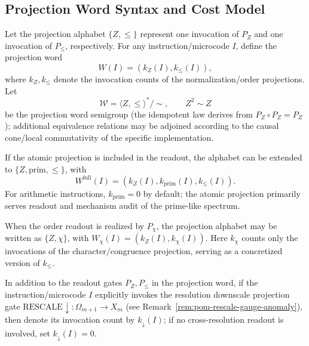 \subsection{Projection Word Syntax and Cost Model}\label{subsec:pom-words}
\begin{definition}\label{def:pom-projection-word}
Let the projection alphabet $\{Z,\le\}$ represent one invocation of $P_Z$ and one invocation of $P_{\le}$, respectively. For any instruction/microcode $I$, define the projection word
\[
W(I)=(k_Z(I),k_{\le}(I)),
\]
where $k_Z,k_{\le}$ denote the invocation counts of the normalization/order projections. Let
\[
\mathcal{W}=\langle Z,\le\rangle^*/\sim,\qquad Z^2\sim Z
\]
be the projection word semigroup (the idempotent law derives from $P_Z\circ P_Z=P_Z$); additional equivalence relations may be adjoined according to the causal cone/local commutativity of the specific implementation.
\end{definition}

\begin{remark}\label{rem:pom-word-prim}
If the atomic projection is included in the readout, the alphabet can be extended to $\{Z,\mathrm{prim},\le\}$, with
\[
W^{\mathrm{full}}(I)=(k_Z(I),k_{\mathrm{prim}}(I),k_{\le}(I)).
\]
For arithmetic instructions, $k_{\mathrm{prim}}=0$ by default; the atomic projection primarily serves readout and mechanism audit of the prime-like spectrum.
\end{remark}

\begin{remark}\label{rem:pom-word-chi}
When the order readout is realized by $P_\chi$, the projection alphabet may be written as $\{Z,\chi\}$, with
\(
W_\chi(I)=(k_Z(I),k_\chi(I))
\).
Here $k_\chi$ counts only the invocations of the character/congruence projection, serving as a concretized version of $k_{\le}$.
\end{remark}

\begin{definition}\label{def:pom-rescale-count}
In addition to the readout gates $P_Z,P_{\le}$ in the projection word, if the instruction/microcode $I$ explicitly invokes the resolution downscale projection gate
\(
\mathrm{RESCALE}\downarrow:\Omega_{m+1}\to X_m
\)
(see Remark~\ref{rem:pom-rescale-gauge-anomaly}), then denote its invocation count by $k_{\downarrow}(I)$; if no cross-resolution readout is involved, set $k_{\downarrow}(I)=0$.
\end{definition}

